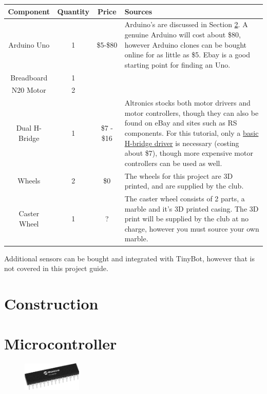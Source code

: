 \documentclass[a4paper,12pt]{article}
\begin{document}
\begin{tabularx}{\linewidth}{cccX}
    \toprule
    Component & Quantity & Price & Sources \\ \midrule
    Arduino Uno & 1 & \$5-\$80 & Arduino's are discussed in Section \ref{sec:microcontroller}. A genuine Arduino will cost about \$80, however Arduino clones can be bought online for as little as \$5. Ebay is a good starting point for finding an Uno. \\
    Breadboard & 1 & & \\
    N20 Motor & 2 & & \\
    Dual H-Bridge & 1 & \$7 - \$16&   Altronics stocks both motor drivers and motor controllers, though they can also be found on eBay and sites such as RS components. For this tutorial, only a \href{https://www.altronics.com.au/p/z2900-l293d-motor-drive-ic/}{basic H-bridge driver} is necessary (costing about \$7), though more expensive motor controllers can be used as well.\\
    Wheels & 2& \$0 & The wheels for this project are 3D printed, and are supplied by the club. \\
    Caster Wheel & 1 & ? & The caster wheel consists of 2 parts, a marble and it's 3D printed casing. The 3D print will be supplied by the club at no charge, however you must source your own marble.\\
    \bottomrule
\end{tabularx}

\bigskip

Additional sensors can be bought and integrated with TinyBot, however that is not covered in this project guide. 

\section{Construction} \label{sec:construction}

\pagebreak
\section{Microcontroller} \label{sec:microcontroller}
\begin{figure}
    \vspace{-1cm}
    \includegraphics[width=0.25\textwidth]{medium-ATmega328-SPDIP-28.png}
    \label{fig:microchip}
\end{figure}
\end{document}
